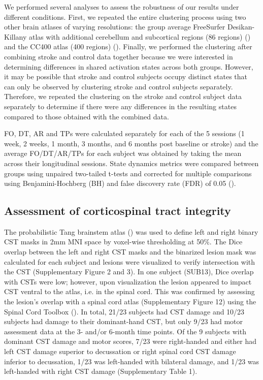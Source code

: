\documentclass[phd,tocprelim]{cornell}
\begin{document}
	 We performed several analyses to assess the robustness of our results under different conditions. First, we repeated the entire clustering process using two other brain atlases of varying resolutions: the group average FreeSurfer Desikan-Killany atlas with additional cerebellum and subcortical regions (86 regions) (\cite{Desikan2006-vf}) and the CC400 atlas (400 regions) (\cite{Craddock2012-kl}). Finally, we performed the clustering after combining stroke and control data together because we were interested in determining differences in shared activation states across both groups. However, it may be possible that stroke and control subjects occupy distinct states that can only be observed by clustering stroke and control subjects separately. Therefore, we repeated the clustering on the stroke and control subject data separately to determine if there were any differences in the resulting states compared to those obtained with the combined data.

	 


	 FO, DT, AR and TPs were calculated separately for each of the 5 sessions (1 week, 2 weeks, 1 month, 3 months, and 6 months post baseline or stroke) and the average FO/DT/AR/TPs for each subject was obtained by taking the mean across their longitudinal sessions. State dynamics metrics were compared between groups using unpaired two-tailed t-tests and corrected for multiple comparisons using Benjamini-Hochberg (BH) and false discovery rate (FDR) of 0.05 (\cite{Benjamini1995-bb}). 

	 \subsection*{Assessment of corticospinal tract integrity}
	 The probabilistic Tang brainstem atlas (\cite{Tang2018-ac}) was used to define left and right binary CST masks in 2mm MNI space by voxel-wise thresholding at 50$\%$. The Dice overlap between the left and right CST masks and the binarized lesion mask was calculated for each subject and lesions were visualized to verify intersection with the CST (Supplementary Figure 2 and 3). In one subject (SUB13), Dice overlap with CSTs were low; however, upon visualization the lesion appeared to impact CST ventral to the atlas, i.e. in the spinal cord. This was confirmed by assessing the lesion's overlap with a spinal cord atlas (Supplementary Figure 12) using the Spinal Cord Toolbox (\cite{De_Leener2017-ev}). In total, 21/23 subjects had CST damage and 10/23 subjects had damage to their dominant-hand CST, but only 9/23 had motor assessment data at the 3- and/or 6-month time points. Of the 9 subjects with dominant CST damage and motor scores, 7/23 were right-handed and either had left CST damage superior to decussation or right spinal cord CST damage inferior to decussation, 1/23 was left-handed with bilateral damage, and 1/23 was left-handed with right CST damage (Supplementary Table 1).
	 
\end{document}
